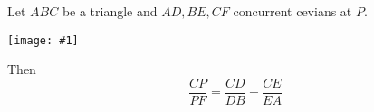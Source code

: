 \documentclass[12pt]{article}
\newcommand{\figura}[1]{\begin{center}\texttt{[image: \#1]}\end{center}}
\begin{document}
Let $ABC$ be a triangle and $AD,BE,CF$ concurrent cevians at $P$.
\figura{aubel}
Then 
\[\frac{CP}{PF} =\frac{CD}{DB} +\frac{CE}{EA}\]
\end{document}
